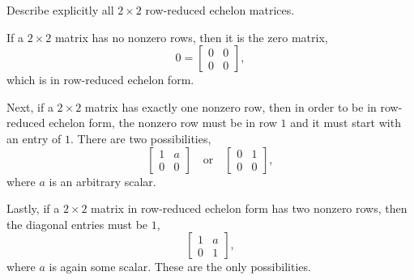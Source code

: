  Describe explicitly all $2\times2$ row-reduced echelon
matrices.
\begin{solution}
  If a $2\times2$ matrix has no nonzero rows, then it is the zero matrix,
  \begin{equation*}
    0 =
    \begin{bmatrix}
      0 & 0 \\
      0 & 0
    \end{bmatrix},
  \end{equation*}
  which is in row-reduced echelon form.

  Next, if a $2\times2$ matrix has exactly one nonzero row, then in
  order to be in row-reduced echelon form, the nonzero row must be in
  row $1$ and it must start with an entry of $1$. There are two
  possibilities,
  \begin{equation*}
    \begin{bmatrix}
      1 & a \\
      0 & 0
    \end{bmatrix}
    \quad\text{or}\quad
    \begin{bmatrix}
      0 & 1 \\
      0 & 0
    \end{bmatrix},
  \end{equation*}
  where $a$ is an arbitrary scalar.

  Lastly, if a $2\times2$ matrix in row-reduced echelon form has two
  nonzero rows, then the diagonal entries must be $1$,
  \begin{equation*}
    \begin{bmatrix}
      1 & a \\
      0 & 1
    \end{bmatrix},
  \end{equation*}
  where $a$ is again some scalar. These are the only possibilities.
\end{solution}
